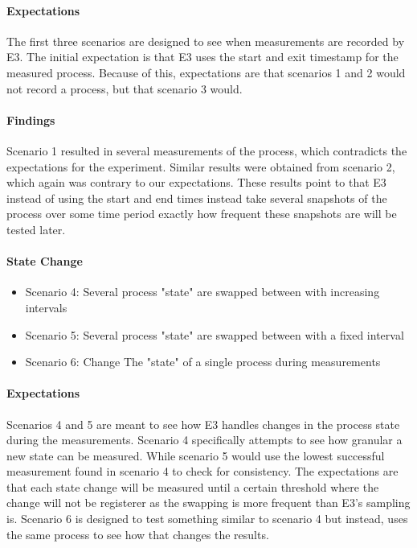 \paragraph {Expectations}
The first three scenarios are designed to see when measurements are recorded by E3. The initial expectation is that E3 uses the start and exit timestamp for the measured process. Because of this, expectations are that scenarios 1 and 2 would not record a process, but that scenario 3 would.

\paragraph{Findings}
Scenario 1 resulted in several measurements of the process, which contradicts the expectations for the experiment. Similar results were obtained from scenario 2, which again was contrary to our expectations. These results point to that E3 instead of using the start and end times instead take several snapshots of the process over some time period exactly how frequent these snapshots are will be tested later. 

\paragraph{State Change}

\begin{itemize}
    \item Scenario 4: Several process "state" are swapped between with increasing intervals
    \item Scenario 5: Several process "state" are swapped between with a fixed interval
    \item Scenario 6: Change The "state" of a single process during measurements
\end{itemize}

\paragraph{Expectations}
Scenarios 4 and 5 are meant to see how E3 handles changes in the process state during the measurements. Scenario 4 specifically attempts to see how granular a new state can be measured. While scenario 5 would use the lowest successful measurement found in scenario 4 to check for consistency. The expectations are that each state change will be measured until a certain threshold where the change will not be registerer as the swapping is more frequent than E3's sampling is. Scenario 6 is designed to test something similar to scenario 4 but instead, uses the same process to see how that changes the results.
